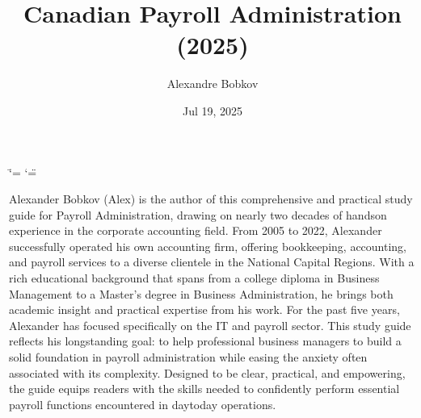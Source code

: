 \documentclass[letterpaper,10pt,english]{sphinxmanual}
\title{Canadian Payroll Administration (2025)}
\date{Jul 19, 2025}
\author{Alexandre Bobkov}
\begin{document}
\ifdefined\shorthandoff
  \ifnum\catcode`\=\string=\active\shorthandoff{=}\fi
  \ifnum\catcode`\"=\active{}\fi
\fi

\pagestyle{empty}
\sphinxmaketitle
\pagestyle{plain}
\sphinxtableofcontents
\pagestyle{normal}
\label{\detokenize{index::doc}}


\sphinxAtStartPar
Alexander Bobkov (Alex) is the author of this comprehensive and practical study guide for Payroll Administration,
drawing on nearly two decades of hands\sphinxhyphen{}on experience in the corporate accounting field. From 2005 to 2022, Alexander successfully
operated his own accounting firm, offering bookkeeping, accounting, and payroll services to a diverse clientele in the National
Capital Regions. With a rich educational background that spans from a college diploma in Business Management to a Master’s
degree in Business Administration, he brings both academic insight and practical expertise from his work. For the past five
years, Alexander has focused specifically on the IT and payroll sector. This study guide reflects his long\sphinxhyphen{}standing goal: to
help professional business managers to build a solid foundation in payroll administration while easing the anxiety often
associated with its complexity. Designed to be clear, practical, and empowering, the guide equips readers with the skills needed
to confidently perform essential payroll functions encountered in day\sphinxhyphen{}to\sphinxhyphen{}day operations.

\sphinxstepscope
\end{document}
